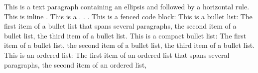 \markdownRendererInterblockSeparator
{}\markdownRendererInterblockSeparator
{}\markdownRendererInterblockSeparator
{}\markdownRendererInterblockSeparator
{}\markdownRendererInterblockSeparator
{}\markdownRendererInterblockSeparator
{}This is a text paragraph containing an ellipsis \markdownRendererEllipsis{} and followed by a horizontal rule.\markdownRendererInterblockSeparator
{}\markdownRendererHorizontalRule{}\markdownRendererInterblockSeparator
{}This is inline . This is a . . .\markdownRendererInterblockSeparator
{}\markdownRendererInterblockSeparator
{}This is a fenced code block:\markdownRendererInterblockSeparator
{}\markdownRendererInterblockSeparator
{}This is a bullet list:\markdownRendererInterblockSeparator
{}\markdownRendererUlBegin
\markdownRendererUlItem The first item of a bullet list\markdownRendererInterblockSeparator
{}that spans several paragraphs,\markdownRendererUlItemEnd 
\markdownRendererUlItem the second item of a bullet list,\markdownRendererUlItemEnd 
\markdownRendererUlItem the third item of a bullet list.\markdownRendererUlItemEnd 
\markdownRendererUlEnd \markdownRendererInterblockSeparator
{}This is a compact bullet list:\markdownRendererInterblockSeparator
{}\markdownRendererUlBeginTight
\markdownRendererUlItem The first item of a bullet list,\markdownRendererUlItemEnd 
\markdownRendererUlItem the second item of a bullet list,\markdownRendererUlItemEnd 
\markdownRendererUlItem the third item of a bullet list.\markdownRendererUlItemEnd 
\markdownRendererUlEndTight \markdownRendererInterblockSeparator
{}This is an ordered list:\markdownRendererInterblockSeparator
{}\markdownRendererOlBegin
{}The first item of an ordered list\markdownRendererInterblockSeparator
{}that spans several paragraphs,\markdownRendererOlItemEnd 
{}the second item of an ordered list,\markdownRendererOlItemEnd 
